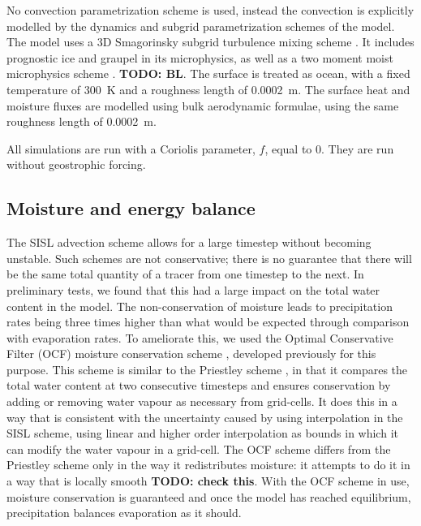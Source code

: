 \documentclass[11pt,a4paper]{article}
\newcommand\todo[1]{\textbf{TODO: #1}}
\begin{document}
No convection parametrization scheme is used, instead the convection is explicitly modelled by the dynamics and subgrid parametrization schemes of the model. The model uses a 3D Smagorinsky subgrid turbulence mixing scheme \parencite{todocite}. It includes prognostic ice and graupel in its microphysics, as well as a two moment moist microphysics scheme \parencite{todocite}. \todo{BL}. The surface is treated as ocean, with a fixed temperature of \SI{300}{K} and a roughness length of \SI{0.0002}{m}. The surface heat and moisture fluxes are modelled using bulk aerodynamic formulae, using the same roughness length of \SI{0.0002}{m}.

All simulations are run with a Coriolis parameter, $f$, equal to 0. They are run without geostrophic forcing.

\subsection{Moisture and energy balance}

The SISL advection scheme allows for a large timestep without becoming unstable. Such schemes are not conservative; there is no guarantee that there will be the same total quantity of a tracer from one timestep to the next. In preliminary tests, we found that this had a large impact on the total water content in the model. The non-conservation of moisture leads to precipitation rates being three times higher than what would be expected through comparison with evaporation rates. To ameliorate this, we used the Optimal Conservative Filter (OCF) moisture conservation scheme \parencite{zerroukat2015monotonic}, developed previously for this purpose. This scheme is similar to the Priestley scheme \parencite{priestley1993quasi}, in that it compares the total water content at two consecutive timesteps and ensures conservation by adding or removing water vapour as necessary from grid-cells. It does this in a way that is consistent with the uncertainty caused by using interpolation in the SISL scheme, using linear and higher order interpolation as bounds in which it can modify the water vapour in a grid-cell. The OCF scheme differs from the Priestley scheme only in the way it redistributes moisture: it attempts to do it in a way that is locally smooth \todo{check this}. With the OCF scheme in use, moisture conservation is guaranteed and once the model has reached equilibrium, precipitation balances evaporation as it should.
\end{document}
